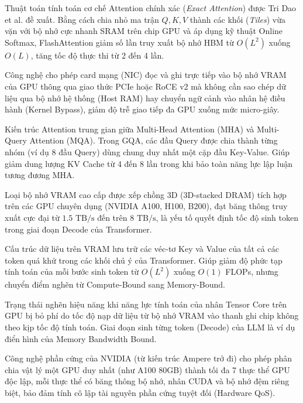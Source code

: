 \begin{description}[leftmargin=2.5cm, style=nextline]
  \item[\term{FlashAttention}] Thuật toán tính toán cơ chế Attention chính xác (\textit{Exact Attention}) được Tri Dao et al. đề xuất. Bằng cách chia nhỏ ma trận $Q, K, V$ thành các khối (\textit{Tiles}) vừa vặn với bộ nhớ cực nhanh SRAM trên chip GPU và áp dụng kỹ thuật Online Softmax, FlashAttention giảm số lần truy xuất bộ nhớ HBM từ $O(L^2)$ xuống $O(L)$, tăng tốc độ thực thi từ 2 đến 4 lần.

  \item[\term{GPUDirect RDMA}] Công nghệ cho phép card mạng (NIC) đọc và ghi trực tiếp vào bộ nhớ VRAM của GPU thông qua giao thức PCIe hoặc RoCE v2 mà không cần sao chép dữ liệu qua bộ nhớ hệ thống (Host RAM) hay chuyển ngữ cảnh vào nhân hệ điều hành (Kernel Bypass), giảm độ trễ giao tiếp đa GPU xuống mức micro-giây.

  \item[\term{Grouped-Query Attention (GQA)}] Kiến trúc Attention trung gian giữa Multi-Head Attention (MHA) và Multi-Query Attention (MQA). Trong GQA, các đầu Query được chia thành từng nhóm (ví dụ 8 đầu Query) dùng chung duy nhất một cặp đầu Key-Value. Giúp giảm dung lượng KV Cache từ 4 đến 8 lần trong khi bảo toàn năng lực lập luận tương đương MHA.

  \item[\term{High Bandwidth Memory (HBM)}] Loại bộ nhớ VRAM cao cấp được xếp chồng 3D (3D-stacked DRAM) tích hợp trên các GPU chuyên dụng (NVIDIA A100, H100, B200), đạt băng thông truy xuất cực đại từ $1.5\text{ TB/s}$ đến trên $8\text{ TB/s}$, là yếu tố quyết định tốc độ sinh token trong giai đoạn Decode của Transformer.

  \item[\term{KV Cache (Key-Value Cache)}] Cấu trúc dữ liệu trên VRAM lưu trữ các véc-tơ Key và Value của tất cả các token quá khứ trong các khối chú ý của Transformer. Giúp giảm độ phức tạp tính toán của mỗi bước sinh token từ $O(L^2)$ xuống $O(1)$ FLOPs, nhưng chuyển điểm nghẽn từ Compute-Bound sang Memory-Bound.

  \item[\term{Memory Bandwidth Bound}] Trạng thái nghẽn hiệu năng khi năng lực tính toán của nhân Tensor Core trên GPU bị bỏ phí do tốc độ nạp dữ liệu từ bộ nhớ VRAM vào thanh ghi chip không theo kịp tốc độ tính toán. Giai đoạn sinh từng token (Decode) của LLM là ví dụ điển hình của Memory Bandwidth Bound.

  \item[\term{Multi-Instance GPU (MIG)}] Công nghệ phần cứng của NVIDIA (từ kiến trúc Ampere trở đi) cho phép phân chia vật lý một GPU duy nhất (như A100 80GB) thành tối đa 7 thực thể GPU độc lập, mỗi thực thể có băng thông bộ nhớ, nhân CUDA và bộ nhớ đệm riêng biệt, bảo đảm tính cô lập tài nguyên phần cứng tuyệt đối (Hardware QoS).


\end{description}

